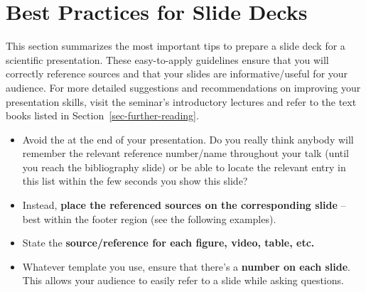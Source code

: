 \documentclass[11pt,a4paper]{article}
\begin{document}
\newpage
\section{Best Practices for Slide Decks}
\label{sec-presentations}
This section summarizes the most important tips to prepare a slide deck for a scientific presentation.
These easy-to-apply guidelines ensure that you will correctly reference sources and that your slides are informative/useful for your audience. 
For more detailed suggestions and recommendations on improving your presentation skills, visit the seminar's introductory lectures and refer to the text books listed in Section~\ref{sec-further-reading}.

\begin{itemize}
  \item Avoid the  at the end of your presentation. Do you really think anybody will remember the relevant reference number/name throughout your talk (until you reach the bibliography slide) or be able to locate the relevant entry in this list within the few seconds you show this slide?
  \item Instead, \textbf{place the referenced sources on the corresponding slide} -- best within the footer region (see the following examples).
  \item State the \textbf{source/reference for each figure, video, table, etc.}
  \item Whatever template you use, ensure that there's a \textbf{number on each slide}. This allows your audience to easily refer to a slide while asking questions.
\end{itemize}
\end{document}
